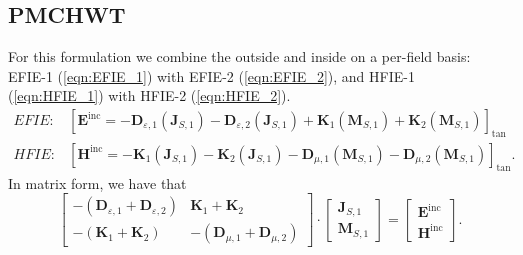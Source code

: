 \documentclass[a4paper,10pt]{book}
\newcommand{\field}[1]{\mathbf{#1}}
\newcommand{\current}[1]{\mathbf{#1}}
\newcommand{\operator}[1]{\mathbf{#1}}
\begin{document}
\subsection{PMCHWT}
%
\par
For this formulation we combine the outside and inside on a per-field basis: EFIE-1 (\ref{eqn:EFIE_1}) with EFIE-2 (\ref{eqn:EFIE_2}), and HFIE-1 (\ref{eqn:HFIE_1}) with HFIE-2 (\ref{eqn:HFIE_2}).
\begin{eqnarray}
EFIE: & \boxed{
\left[\field{E}^\text{inc} =  - \operator{D}_{\varepsilon, 1}\left(\current{J}_{S,1}\right) - \operator{D}_{\varepsilon, 2}\left(\current{J}_{S,1}\right) + \operator{K}_{1}\left(\current{M}_{S,1}\right) + \operator{K}_{2}\left(\current{M}_{S,1}\right) \right]_\text{tan} } \\
HFIE: & \boxed{
\left[\field{H}^\text{inc} = - \operator{K}_{1}\left(\current{J}_{S,1}\right) - \operator{K}_{2}\left(\current{J}_{S,1}\right) - \operator{D}_{\mu, 1}\left(\current{M}_{S,1}\right) - \operator{D}_{\mu, 2}\left(\current{M}_{S,1}\right)  \right]_\text{tan} }.
\end{eqnarray}
In matrix form, we have that
\begin{equation}
\left[
\begin{matrix}
  - \left(\operator{D}_{\varepsilon, 1} + \operator{D}_{\varepsilon, 2} \right) & \operator{K}_{1} + \operator{K}_{2} \\
  -\left(\operator{K}_{1} + \operator{K}_{2} \right) & - \left(\operator{D}_{\mu, 1} + \operator{D}_{\mu, 2}\right)
\end{matrix}
\right]
\cdot 
\left[
\begin{matrix}
  \current{J}_{S,1} \\
  \current{M}_{S,1}  
\end{matrix}
\right]
=
\left[
\begin{matrix}
  \field{E}^\text{inc} \\
  \field{H}^\text{inc}
\end{matrix}
\right].
\end{equation}
\end{document}
